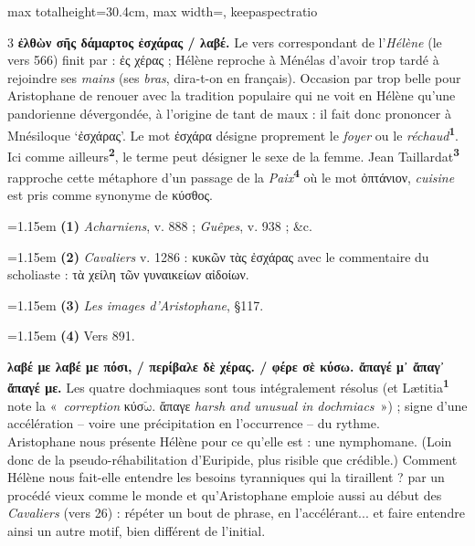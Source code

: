 \documentclass[11pt,twoside]{book}
\newcommand{\italique}[1]{\textit{#1}}
\newcommand{\lettreBreve}[1]{$\breve{\mbox{#1}}$}
\newcommand{\anglais}[1]{\textit{#1}}
\newcommand{\marqueur}[1]{\textsuperscript{\color{rubricRed}\textbf{#1}}}
\begin{document}
\begin{adjustbox}{max totalheight=30.4cm, max width=\textwidth, keepaspectratio}
\begin{minipage}{\textwidth}
{\begin{multicols}{3}
 \textbf{ἐλθὼν σῆς δάμαρτος ἐσχάρας / λαβέ.} Le vers correspondant de l'\italique{Hélène} (le vers 566) finit par : ἐς χέρας ; Hélène reproche à Ménélas d'avoir trop tardé à rejoindre ses \italique{mains} (ses \italique{bras}, dira-t-on en français). Occasion par trop belle pour Aristophane de renouer avec la tradition populaire qui ne voit en Hélène qu'une pandorienne dévergondée, à l'origine de tant de maux : il fait donc prononcer à Mnésiloque `ἐσχάρας'. Le mot ἐσχάρα désigne proprement le \italique{foyer} ou le \italique{réchaud}\marqueur{1}. Ici comme ailleurs\marqueur{2}, le terme peut désigner le sexe de la femme. Jean Taillardat\marqueur{3} rapproche cette métaphore d'un passage de la \italique{Paix}\marqueur{4} où le mot ὀπτάνιον, \italique{cuisine} est pris comme synonyme de κύσθος.
\par\vspace{1.5pt}
\par\vspace{1.2pt}\par\nopagebreak\vspace{1pt}\noindent\hangindent=1.15em {\color{sepiaNote}\textbf{(1)}} \italique{Acharniens}, v. 888 ; \italique{Guêpes}, v. 938 ; \&c.
\par\vspace{1.5pt}
\noindent\hangindent=1.15em {\color{sepiaNote}\textbf{(2)}} \italique{Cavaliers} v. 1286 : κυκῶν τὰς ἐσχάρας avec le commentaire du scholiaste : τὰ χείλη τῶν γυναικείων αἰδοίων.
\par\vspace{1.5pt}
\noindent\hangindent=1.15em {\color{sepiaNote}\textbf{(3)}} \italique{Les images d'Aristophane}, §117.
\par\vspace{1.5pt}
\noindent\hangindent=1.15em {\color{sepiaNote}\textbf{(4)}} Vers 891.
\par\vspace{1.5pt}
 \textbf{λαβέ με λαβέ με πόσι, / περίβαλε δὲ χέρας. / φέρε σὲ κύσω. ἄπαγέ μ᾽ ἄπαγ᾽ ἄπαγέ με.} Les quatre dochmiaques sont tous intégralement résolus (et Lætitia\marqueur{1} note la «~\anglais{correption }κύσ\lettreBreve{ω}. ἄπαγε \anglais{harsh and unusual in dochmiacs}~») ; signe d'une accélération -- voire une précipitation en l'occurrence -- du rythme.\\ Aristophane nous présente Hélène pour ce qu'elle est : une nymphomane. (Loin donc de la pseudo-réhabilitation d'Euripide, plus risible que crédible.) Comment Hélène nous fait-elle entendre les besoins tyranniques qui la tiraillent ? par un procédé vieux comme le monde et qu'Aristophane emploie aussi au début des \italique{Cavaliers} (vers 26) : répéter un bout de phrase, en l'accélérant... et faire entendre ainsi un autre motif, bien différent de l'initial.

\end{multicols}}
\end{minipage}
\end{adjustbox}
\end{document}
